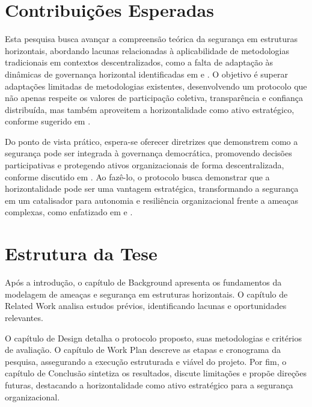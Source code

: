 \section{Contribuições Esperadas} 
\label{sec:contribuicoes_esperadas}

Esta pesquisa busca avançar a compreensão teórica da segurança em
estruturas horizontais, abordando lacunas relacionadas à aplicabilidade de
metodologias tradicionais em contextos descentralizados, como a falta de
adaptação às dinâmicas de governança horizontal identificadas em
\cite{ThreatModelingAsABasisForSecurityRequirements} e
\cite{DemystifyingTheThreatModelingProcess}. O objetivo é superar
adaptações limitadas de metodologias existentes, desenvolvendo um protocolo
que não apenas respeite os valores de participação coletiva, transparência
e confiança distribuída, mas também aproveitem a horizontalidade como ativo
estratégico, conforme sugerido em \cite{Colbac}.

Do ponto de vista prático, espera-se oferecer diretrizes que demonstrem
como a segurança pode ser integrada à governança democrática, promovendo
decisões participativas e protegendo ativos organizacionais de forma
descentralizada, conforme discutido em \cite{Non-HierarchicalForms}. Ao
fazê-lo, o protocolo busca demonstrar que a horizontalidade pode ser uma
vantagem estratégica, transformando a segurança em um catalisador para
autonomia e resiliência organizacional frente a ameaças complexas, como
enfatizado em \cite{Reputation-basedDAO} e \cite{AbcCrypto}.



\section{Estrutura da Tese} 
\label{sec:estrutura_tese}

Após a introdução, o capítulo de Background apresenta os fundamentos
da modelagem de ameaças e segurança em estruturas horizontais. O
capítulo de Related Work analisa estudos prévios, identificando
lacunas e oportunidades relevantes.

O capítulo de Design detalha o protocolo proposto, suas metodologias e
critérios de avaliação. O capítulo de Work Plan descreve as etapas e
cronograma da pesquisa, assegurando a execução estruturada e viável do
projeto. Por fim, o capítulo de Conclusão sintetiza os resultados,
discute limitações e propõe direções futuras, destacando a
horizontalidade como ativo estratégico para a segurança
organizacional.
